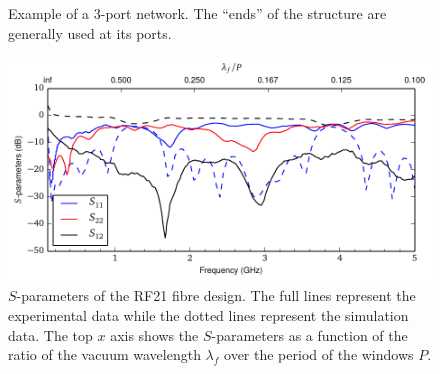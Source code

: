 \begin{figure}
 \begin{center}
 \end{center}
 \caption[Example of a 3-port network]{Example of a 3-port network. The ``ends'' of the structure are generally used at its ports.}
 \label{fig:antenna.network}
\end{figure}

\begin{figure}
 \centering
 \includegraphics[width=\textwidth]{figs/active/sParametersRF21.pdf}
 \caption[$S$-parameters of the RF21 fibre design]{$S$-parameters of the RF21 fibre design. The full lines represent
	  the experimental data while the dotted lines represent the simulation data.
	  The top $x$ axis shows the $S$-parameters as a function of the ratio of the 
	  vacuum wavelength $\lambda_f$ over the period of the windows $P$.}
 \label{fig:antenna.sParameters}
\end{figure}


